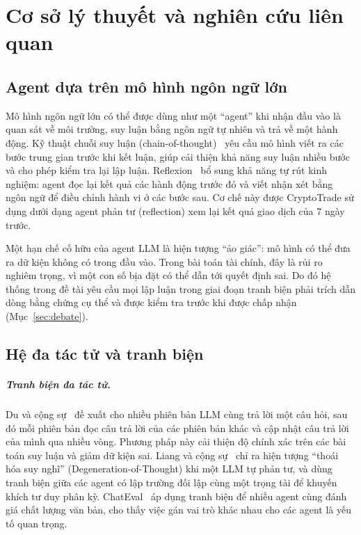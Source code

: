 \chapter{Cơ sở lý thuyết và nghiên cứu liên quan}
\label{chap:background}

\section{Agent dựa trên mô hình ngôn ngữ lớn}
Mô hình ngôn ngữ lớn có thể được dùng như một ``agent'' khi nhận đầu vào là quan sát về môi trường, suy luận bằng ngôn
ngữ tự nhiên và trả về một hành động. Kỹ thuật chuỗi suy luận (chain-of-thought)~\cite{wei2022cot} yêu cầu mô hình
viết ra các bước trung gian trước khi kết luận, giúp cải thiện khả năng suy luận nhiều bước và cho phép kiểm tra lại
lập luận. Reflexion~\cite{shinn2023reflexion} bổ sung khả năng tự rút kinh nghiệm: agent đọc lại kết quả các hành động
trước đó và viết nhận xét bằng ngôn ngữ để điều chỉnh hành vi ở các bước sau. Cơ chế này được CryptoTrade sử dụng dưới
dạng agent phản tư (reflection) xem lại kết quả giao dịch của 7 ngày trước.

Một hạn chế cố hữu của agent LLM là hiện tượng ``ảo giác'': mô hình có thể đưa ra dữ kiện không có trong đầu vào. Trong
bài toán tài chính, đây là rủi ro nghiêm trọng, vì một con số bịa đặt có thể dẫn tới quyết định sai. Do đó hệ thống
trong đề tài yêu cầu mọi lập luận trong giai đoạn tranh biện phải trích dẫn dòng bằng chứng cụ thể và được kiểm tra
trước khi được chấp nhận (Mục~\ref{sec:debate}).

\section{Hệ đa tác tử và tranh biện}
\paragraph{Tranh biện đa tác tử.}
Du và cộng sự~\cite{du2024debate} đề xuất cho nhiều phiên bản LLM cùng trả lời một câu hỏi, sau đó mỗi phiên bản đọc
câu trả lời của các phiên bản khác và cập nhật câu trả lời của mình qua nhiều vòng. Phương pháp này cải thiện độ chính
xác trên các bài toán suy luận và giảm dữ kiện sai. Liang và cộng sự~\cite{liang2024divergent} chỉ ra hiện tượng ``thoái hóa
suy nghĩ'' (Degeneration-of-Thought) khi một LLM tự phản tư, và dùng tranh biện giữa các agent có lập trường đối lập cùng một trọng tài để
khuyến khích tư duy phân kỳ. ChatEval~\cite{chan2024chateval} áp dụng tranh biện để nhiều agent cùng đánh giá chất
lượng văn bản, cho thấy việc gán vai trò khác nhau cho các agent là yếu tố quan trọng.

